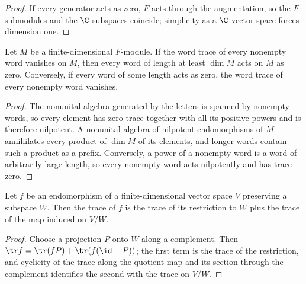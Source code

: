 \begin{proof}
    \leanok
    If every generator acts as zero, $F$ acts through the augmentation, so
    the $F$-submodules and the $\C$-subspaces coincide; simplicity as a
    $\C$-vector space forces dimension one.
\end{proof}

\begin{lemma}
    \label{lem:wordflags_nilpotent_module}
    \leanok
    Let $M$ be a finite-dimensional $F$-module. If the word trace of every
    nonempty word vanishes on $M$, then every word of length at least
    $\dim M$ acts on $M$ as zero. Conversely, if every word of some length
    acts as zero, the word trace of every nonempty word vanishes.
\end{lemma}

\begin{proof}
    \leanok
    The nonunital algebra generated by the letters is spanned by nonempty
    words, so every element has zero trace together with all its positive
    powers and is therefore nilpotent. A nonunital algebra of nilpotent
    endomorphisms of $M$ annihilates every product of $\dim M$ of its
    elements, and longer words contain such a product as a prefix.
    Conversely, a power of a nonempty word is a word of arbitrarily large
    length, so every nonempty word acts nilpotently and has trace zero.
\end{proof}

\begin{lemma}
    \label{lem:wordflags_trace_invariant_subspace}
    \leanok
    Let $f$ be an endomorphism of a finite-dimensional vector space $V$
    preserving a subspace $W$. Then the trace of $f$ is the trace of its
    restriction to $W$ plus the trace of the map induced on $V/W$.
\end{lemma}

\begin{proof}
    \leanok
    Choose a projection $P$ onto $W$ along a complement. Then
    $\tr f=\tr(fP)+\tr(f(\id-P))$; the first term is the trace of the
    restriction, and cyclicity of the trace along the quotient map and its
    section through the complement identifies the second with the trace on
    $V/W$.
\end{proof}

